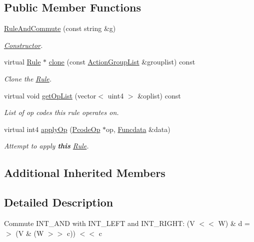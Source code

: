\subsection*{Public Member Functions}
\begin{DoxyCompactItemize}
\item 
\mbox{\hyperlink{class_rule_and_commute_a038fb368ee512306b68265c7b8ac6868}{Rule\+And\+Commute}} (const string \&g)
\begin{DoxyCompactList}\small\item\em \mbox{\hyperlink{class_constructor}{Constructor}}. \end{DoxyCompactList}\item 
virtual \mbox{\hyperlink{class_rule}{Rule}} $\ast$ \mbox{\hyperlink{class_rule_and_commute_a21d46bfc5ca2a55556aa603e28b62497}{clone}} (const \mbox{\hyperlink{class_action_group_list}{Action\+Group\+List}} \&grouplist) const
\begin{DoxyCompactList}\small\item\em Clone the \mbox{\hyperlink{class_rule}{Rule}}. \end{DoxyCompactList}\item 
virtual void \mbox{\hyperlink{class_rule_and_commute_abed13b32d01609ce87cba5cc9020a0c8}{get\+Op\+List}} (vector$<$ uint4 $>$ \&oplist) const
\begin{DoxyCompactList}\small\item\em List of op codes this rule operates on. \end{DoxyCompactList}\item 
virtual int4 \mbox{\hyperlink{class_rule_and_commute_a4dd1bf0f7f55f84c7136a9fb4f44120f}{apply\+Op}} (\mbox{\hyperlink{class_pcode_op}{Pcode\+Op}} $\ast$op, \mbox{\hyperlink{class_funcdata}{Funcdata}} \&data)
\begin{DoxyCompactList}\small\item\em Attempt to apply {\bfseries{this}} \mbox{\hyperlink{class_rule}{Rule}}. \end{DoxyCompactList}\end{DoxyCompactItemize}
\subsection*{Additional Inherited Members}


\subsection{Detailed Description}
Commute I\+N\+T\+\_\+\+A\+ND with I\+N\+T\+\_\+\+L\+E\+FT and I\+N\+T\+\_\+\+R\+I\+G\+HT\+: {\ttfamily (V $<$$<$ W) \& d =$>$ (V \& (W $>$$>$ c)) $<$$<$ c} 

